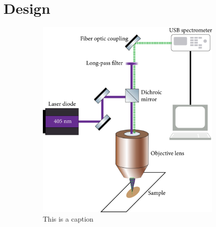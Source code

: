 \section{Design}

\begin{figure}[h]
    \begin{subfigure}{.5\textwidth}
        \centering
        \includegraphics[width=\textwidth]{img/optical-diagram.png}
        \caption{This is a caption}
        \label{img:optical-diagram}
    \end{subfigure}
    \begin{subfigure}{.5\textwidth}
        \centering

\end{subfigure}
\end{figure}
